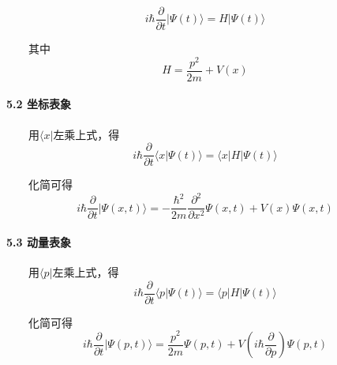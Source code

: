 \documentclass[UTF8,twocolumn]{ctexart}
\let\oldparagraph\paragraph
\renewcommand{\paragraph}[1]{\oldparagraph{#1}\mbox{}}
\begin{document}
\[i\hbar\frac{\partial}{\partial t}|\Psi(t)\rangle=H|\Psi(t)\rangle\]

  其中 \[H=\frac{p^2}{2m}+V(x)\]

\hypertarget{ux5750ux6807ux8868ux8c61-1}{%
\paragraph{ 5.2 坐标表象}\label{ux5750ux6807ux8868ux8c61-1}}

  用\(\langle x|\)左乘上式，得
\[i\hbar\frac{\partial}{\partial t}\langle x|\Psi(t)\rangle=\langle x|H|\Psi(t)\rangle\]

  化简可得
\[i\hbar\frac{\partial}{\partial t}|\Psi(x,t)\rangle=-\frac{\hbar^2}{2m}\frac{\partial^2}{\partial x^2}\Psi(x,t)+V(x)\Psi(x,t)\]

\hypertarget{ux52a8ux91cfux8868ux8c61-1}{%
\paragraph{ 5.3 动量表象}\label{ux52a8ux91cfux8868ux8c61-1}}

  用\(\langle p|\)左乘上式，得
\[i\hbar\frac{\partial}{\partial t}\langle p|\Psi(t)\rangle=\langle p|H|\Psi(t)\rangle\]

  化简可得
\[i\hbar\frac{\partial}{\partial t}|\Psi(p,t)\rangle=\frac{p^2}{2m}\Psi(p,t)+V(i\hbar\frac{\partial}{\partial p})\Psi(p,t)\]
\end{document}
